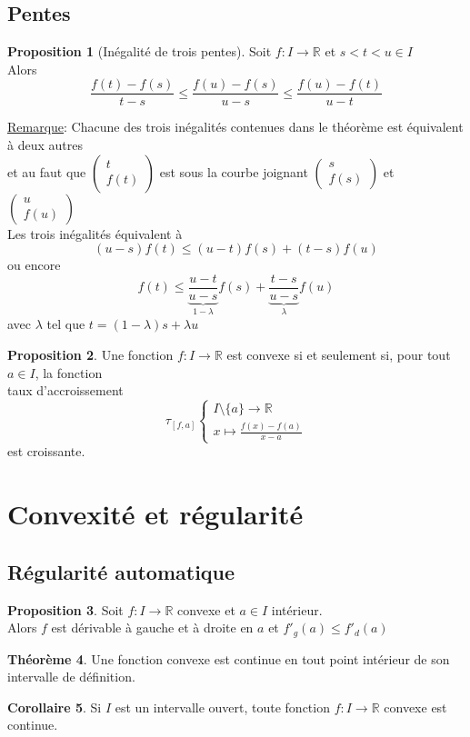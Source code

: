 \documentclass[10pt,a4paper]{article}
\theoremstyle{definition}
\newtheorem{proposition}{Proposition}[section]
\newtheorem{theorem}[proposition]{Théorème}
\newtheorem{corollaire}[proposition]{Corollaire}
\begin{document}
\pagebreak

\subsection{Pentes}
\begin{proposition}[Inégalité de trois pentes]
Soit $f: I \to \mathbb{R}$ et $s < t < u \in I$ \\
Alors
\[\frac{f(t) - f(s)}{t - s} \leq \frac{f(u) - f(s)}{u - s} \leq \frac{f(u) - f(t)}{u - t}\]
\end{proposition} \medskip

\noindent \uline{Remarque}: Chacune des trois inégalités contenues dans le théorème est équivalent à deux autres \\
et au faut que $\begin{pmatrix} t \\ f(t) \end{pmatrix}$ est sous la courbe joignant $\begin{pmatrix} s \\ f(s) \end{pmatrix}$ et $\begin{pmatrix} u \\ f(u) \end{pmatrix}$  \\
Les trois inégalités équivalent à
\[ (u - s)f(t) \leq (u - t)f(s) + (t - s)f(u) \]
ou encore
\[ f(t) \leq \underbrace{\frac{u - t}{u - s}}_{1 - \lambda}f(s) + \underbrace{\frac{t - s}{u - s}}_{\lambda}f(u) \]
avec $\lambda$ tel que $t = (1 - \lambda) s + \lambda u$

\begin{proposition}
Une fonction $f: I \to \mathbb{R}$ est convexe si et seulement si, pour tout $a \in I$, la fonction \\
taux d'accroissement
\[ \tau_{[f, a]} \begin{cases}
I \setminus \{ a \} \to \mathbb{R} \\
x \mapsto \frac{f(x) - f(a)}{x - a}
\end{cases} \]
est croissante.
\end{proposition}

\section{Convexité et régularité}
\subsection{Régularité automatique}
\begin{proposition}
Soit $f: I \to \mathbb{R}$ convexe et $a \in I$ intérieur. \\
Alors $f$ est dérivable à gauche et à droite en $a$ et $f'_g(a) \leq f'_d(a)$
\end{proposition}
\begin{theorem}
Une fonction convexe est continue en tout point intérieur de son intervalle de définition.
\end{theorem}
\begin{corollaire}
Si $I$ est un intervalle ouvert, toute fonction $f: I \to \mathbb{R}$ convexe est continue.
\end{corollaire}
\end{document}
